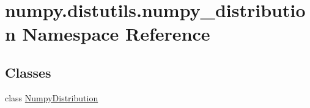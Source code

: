 \hypertarget{namespacenumpy_1_1distutils_1_1numpy__distribution}{}\section{numpy.\+distutils.\+numpy\+\_\+distribution Namespace Reference}
\label{namespacenumpy_1_1distutils_1_1numpy__distribution}
\subsection*{Classes}
\begin{DoxyCompactItemize}
\item 
class \hyperlink{classnumpy_1_1distutils_1_1numpy__distribution_1_1NumpyDistribution}{Numpy\+Distribution}
\end{DoxyCompactItemize}
